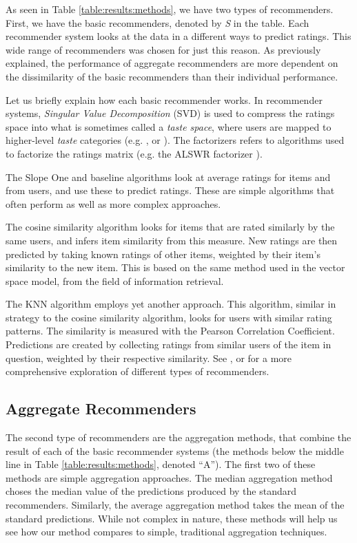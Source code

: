 As seen in Table \ref{table:results:methods}, we have two types of recommenders.
First, we have the basic recommenders, denoted by \emph{S} in the table.
Each recommender system looks at the data in a different ways to predict ratings.
This wide range of recommenders was chosen for just this reason.
As previously explained, the performance of aggregate recommenders
are more dependent on the dissimilarity of the basic recommenders
than their individual performance.

Let us briefly explain how each basic recommender works.
In recommender systems, \emph{Singular Value Decomposition} (SVD) is used to compress 
the ratings space into what is sometimes called a \emph{taste space},
where users are mapped to higher-level \emph{taste} categories
(e.g. \cite[p5]{Ahn2004}, \cite[p4]{Brand2003} or \cite[p2]{Liu2006}).
The factorizers refers to algorithms used to factorize the ratings matrix
(e.g. the ALSWR factorizer \cite{Zhou2008}).

The Slope One and baseline algorithms look at average
ratings for items and from users, and use these to predict ratings.
These are simple algorithms that often perform as well
as more complex approaches.

The cosine similarity algorithm looks for items that are rated
similarly by the same users, and infers item similarity from this measure.
New ratings are then predicted by taking known ratings of other items,
weighted by their item's similarity to the new item.
This is based on the same method used in the vector space model,
from the field of information retrieval.

The KNN algorithm employs yet another approach. This algorithm,
similar in strategy to the cosine similarity algorithm,
looks for users with similar rating patterns.
The similarity is measured with the Pearson Correlation Coefficient.
Predictions are created by collecting ratings from similar users
of the item in question, weighted by their respective similarity.
See \cite{Adomavicius2005}, \cite{Pazzani2007} or \cite{Schafer2007}
for a more comprehensive exploration of different types of recommenders.


\subsection{Aggregate Recommenders}

The second type of recommenders are the aggregation methods, 
that combine the result of each of the basic recommender systems
(the methods below the middle line in Table \ref{table:results:methods},
denoted ``A'').
The first two of these methods are simple aggregation approaches.
The median aggregation method choses the median value of the predictions
produced by the standard recommenders.
Similarly, the average aggregation method takes the mean of the
standard predictions.
While not complex in nature, these methods
will help us see how our method compares to simple, traditional
aggregation techniques.

